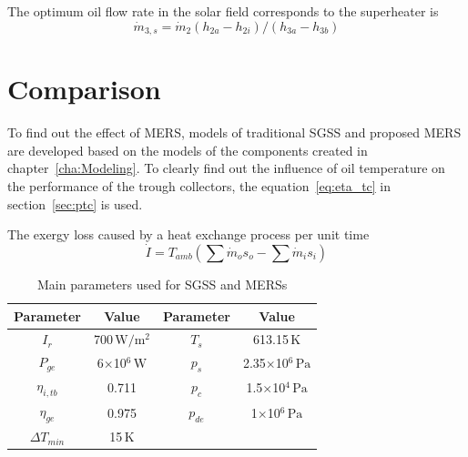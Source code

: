 The optimum oil flow rate in the solar field corresponds to the superheater is
\begin{equation}
  \dot{m}_{3,s} = \dot{m}_{2}(h_{2a} - h_{2i})/(h_{3a} - h_{3b})
\end{equation}

\section{Comparison}

To find out the effect of MERS, models of traditional SGSS and proposed MERS are developed based on the models of the components created in chapter~\ref{cha:Modeling}. 
To clearly find out the influence of oil temperature on the performance of the trough collectors, the equation~\ref{eq:eta_tc} in section~\ref{sec:ptc} is used.

The exergy loss caused by a heat exchange process per unit time
\begin{equation}
  \dot{I} = T_{amb} (\sum \dot{m}_os_o - \sum \dot{m}_is_i)
  \label{eq:dot_I}
\end{equation}

\begin{table}[htbp]
	\caption{Main parameters used for SGSS and MERSs}
	\begin{center}
	\begin{tabular}{cccc}
		\toprule
		Parameter		&	Value	&	Parameter		&	Value\\
		\midrule
		$I_r$	&	700$\,\mathrm{W/m^2}$	&	$T_s$		&	613.15$\,\mathrm{K}$\\
		$P_{ge}$	&	6$\times$10$^6\,\mathrm{W}$	&	$p_s$		&	2.35$\times$10$^6\,\mathrm{Pa}$\\
		$\eta_{i,tb}$	&	0.711	&	$p_c$		&	1.5$\times$10$^4\,\mathrm{Pa}$\\
		$\eta_{ge}$	&	0.975	&	$p_{de}$		&	1$\times$10$^6\,\mathrm{Pa}$\\
		$\Delta T_{min}$	&	15$\,\mathrm{K}$	&	&\\		
		\bottomrule
	\end{tabular}
	\end{center}
	\label{tab:ptc}
\end{table}

